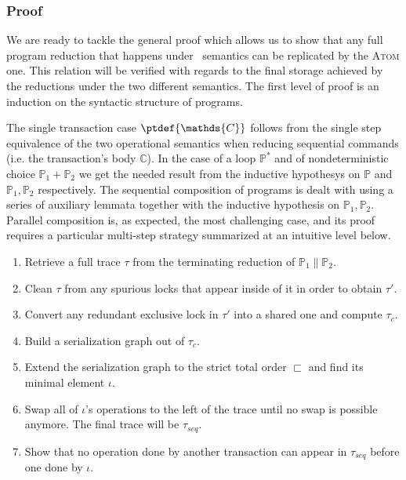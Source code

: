 \subsubsection{Proof}

We are ready to tackle the general proof which allows us to show that any full program reduction that happens under \tpl\ semantics can be replicated by the \textsc{Atom} one. This relation will be verified with regards to the final storage achieved by the reductions under the two different semantics. The first level of proof is an induction on the syntactic structure of programs.

The single transaction case $\ptdef{\mathds{C}}$ follows from the single step equivalence of the two operational semantics when reducing sequential commands (i.e. the transaction's body $\mathds{C}$). In the case of a loop $\mathds{P}^*$ and of nondeterministic choice $\mathds{P}_1 + \mathds{P}_2$ we get the needed result from the inductive hypothesys on $\mathds{P}$ and $\mathds{P}_1, \mathds{P}_2$ respectively. The sequential composition of programs is dealt with using a series of auxiliary lemmata together with the inductive hypothesis on $\mathds{P}_1, \mathds{P}_2$. Parallel composition is, as expected, the most challenging case, and its proof requires a particular multi-step strategy summarized at an intuitive level below.
\begin{enumerate}
	\item Retrieve a full trace $\tau$ from the terminating reduction of $\mathds{P}_1 \| \mathds{P}_2$.
	
	\item Clean $\tau$ from any spurious locks that appear inside of it in order to obtain $\tau'$.
	
	\item Convert any redundant exclusive lock in $\tau'$ into a shared one and compute $\tau_{c}$.
	
	\item Build a serialization graph out of $\tau_{c}$.
	
	\item Extend the serialization graph to the strict total order $\sqsubset$ and find its minimal element $\iota$.
	
	\item Swap all of $\iota$'s operations to the left of the trace until no swap is possible anymore. The final trace will be $\tau_{seq}$.
	
	\item Show that no operation done by another transaction can appear in $\tau_{seq}$ before one done by $\iota$.
\end{enumerate}

